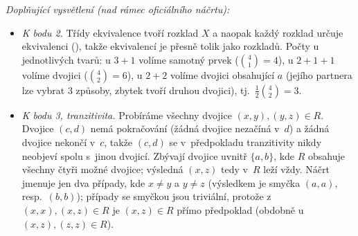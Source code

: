\medskip
\noindent\textit{Doplňující vysvětlení (nad rámec oficiálního náčrtu):}
\begin{itemize}
  \item \emph{K bodu 2.} Třídy ekvivalence tvoří rozklad $X$ a naopak každý rozklad určuje ekvivalenci (), takže ekvivalencí je přesně tolik jako rozkladů. Počty u jednotlivých tvarů: u $3+1$ volíme samotný prvek ($\binom41=4$), u $2+1+1$ volíme dvojici ($\binom42=6$), u $2+2$ volíme dvojici obsahující $a$ (jejího partnera lze vybrat $3$ způsoby, zbytek tvoří druhou dvojici), tj.\ $\tfrac12\binom42=3$.
  \item \emph{K bodu 3, tranzitivita.} Probíráme všechny dvojice $(x,y),(y,z)\in R$. Dvojice $(c,d)$ nemá pokračování (žádná dvojice nezačíná v~$d$) a žádná dvojice nekončí v~$c$, takže $(c,d)$ se v~předpokladu tranzitivity nikdy neobjeví spolu s~jinou dvojicí. Zbývají dvojice uvnitř $\{a,b\}$, kde $R$ obsahuje všechny čtyři možné dvojice; výsledná $(x,z)$ tedy v~$R$ leží vždy. Náčrt jmenuje jen dva případy, kde $x\ne y$ a $y\ne z$ (výsledkem je smyčka $(a,a)$, resp.\ $(b,b)$); případy se smyčkou jsou triviální, protože z~$(x,x),(x,z)\in R$ je $(x,z)\in R$ přímo předpoklad (obdobně u~$(x,z),(z,z)\in R$).
\end{itemize}
